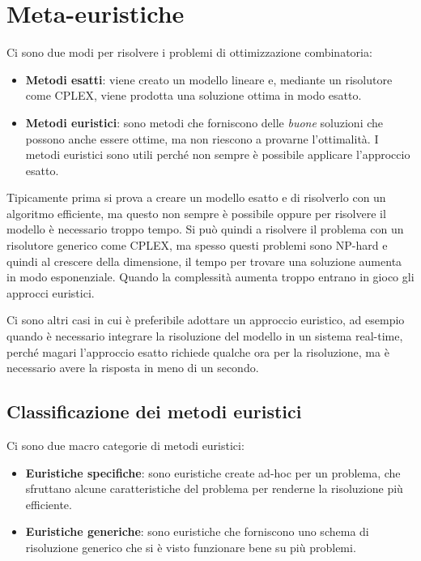 
\chapter{Meta-euristiche}

Ci sono due modi per risolvere i problemi di ottimizzazione combinatoria:

\begin{itemize}
	\item \textbf{Metodi esatti}: viene creato un modello lineare e, mediante un risolutore come CPLEX, viene prodotta una soluzione ottima in modo esatto.
	\item \textbf{Metodi euristici}: sono metodi che forniscono delle \textit{buone} soluzioni che possono anche essere ottime, ma non riescono a provarne l'ottimalità.  I metodi euristici sono utili perché non sempre è possibile applicare l'approccio esatto.
\end{itemize}

\noindent Tipicamente prima si prova a creare un modello esatto e di risolverlo con un algoritmo efficiente, ma questo non sempre è possibile oppure per risolvere il modello è necessario troppo tempo.
Si può quindi a risolvere il problema con un risolutore generico come CPLEX, ma spesso questi problemi sono NP-hard e quindi al crescere della dimensione, il tempo per trovare una soluzione aumenta in modo esponenziale.
Quando la complessità aumenta troppo entrano in gioco gli approcci euristici.

Ci sono altri casi in cui è preferibile adottare un approccio euristico, ad esempio quando è necessario integrare la risoluzione del modello in un sistema real-time, perché magari l'approccio esatto richiede qualche ora per la risoluzione, ma è necessario avere la risposta in meno di un secondo.

\section{Classificazione dei metodi euristici}

Ci sono due macro categorie di metodi euristici:

\begin{itemize}
	\item \textbf{Euristiche specifiche}: sono euristiche create ad-hoc per un problema, che sfruttano alcune caratteristiche del problema per renderne la risoluzione più efficiente.
	\item \textbf{Euristiche generiche}: sono euristiche che forniscono uno schema di risoluzione generico che si è visto funzionare bene su più problemi.
\end{itemize}

